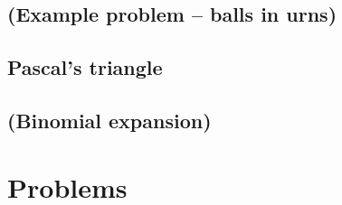 


\subsection{(Example problem -- balls in urns)}

\subsection{Pascal's triangle}

\subsection{(Binomial expansion)}




\newpage
\section{Problems}

